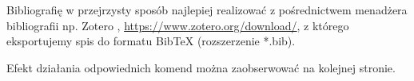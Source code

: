 Bibliografię w przejrzysty sposób najlepiej realizować z pośrednictwem menadżera bibliografii np. Zotero \cite{noauthor_zotero_nodate-1}, \cite{noauthor_zotero_nodate} \url{https://www.zotero.org/download/}, z którego eksportujemy spis do formatu BibTeX (rozszerzenie *.bib).  

Efekt działania odpowiednich komend można zaobserwować na kolejnej stronie. 

\newpage


